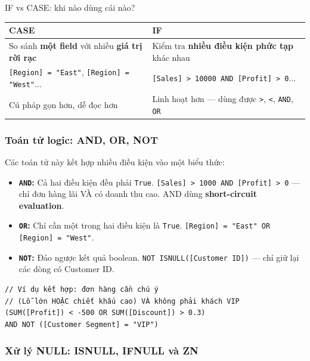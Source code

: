 \documentclass[12pt]{article}
\begin{document}
\begin{tipbox}{IF vs CASE: khi nào dùng cái nào?}
\renewcommand{\arraystretch}{1.3}
\begin{tabularx}{\linewidth}{X X}
\toprule
\textbf{CASE} & \textbf{IF} \\
\midrule
So sánh \textbf{một field} với nhiều \textbf{giá trị rời rạc} & Kiểm tra \textbf{nhiều điều kiện phức tạp} khác nhau \\
\texttt{[Region] = "East"}, \texttt{[Region] = "West"}... & \texttt{[Sales] > 10000 AND [Profit] > 0}... \\
Cú pháp gọn hơn, dễ đọc hơn & Linh hoạt hơn --- dùng được \texttt{>}, \texttt{<}, \texttt{AND}, \texttt{OR} \\
\bottomrule
\end{tabularx}
\end{tipbox}

\subsubsection{Toán tử logic: AND, OR, NOT}

\noindent Các toán tử này kết hợp nhiều điều kiện vào một biểu thức:

\begin{itemize}
    \item \textbf{\texttt{AND}:} Cả hai điều kiện đều phải \texttt{True}. \texttt{[Sales] > 1000 AND [Profit] > 0} --- chỉ đơn hàng lãi VÀ có doanh thu cao. AND dùng \textbf{short-circuit evaluation}.

    \item \textbf{\texttt{OR}:} Chỉ cần một trong hai điều kiện là \texttt{True}. \texttt{[Region] = "East" OR [Region] = "West"}.

    \item \textbf{\texttt{NOT}:} Đảo ngược kết quả boolean. \texttt{NOT ISNULL([Customer ID])} --- chỉ giữ lại các dòng có Customer ID.
\end{itemize}

\begin{aivncodebox}[]
\begin{lstlisting}
// Ví dụ kết hợp: đơn hàng cần chú ý
// (Lỗ lớn HOẶC chiết khấu cao) VÀ không phải khách VIP
(SUM([Profit]) < -500 OR SUM([Discount]) > 0.3)
AND NOT ([Customer Segment] = "VIP")
\end{lstlisting}
\end{aivncodebox}

\subsubsection{Xử lý NULL: ISNULL, IFNULL và ZN}
\end{document}
